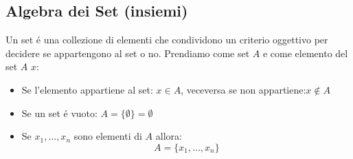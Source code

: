     \subsection{Algebra dei Set (insiemi)}
        Un set é una collezione di elementi che condividono un criterio oggettivo per decidere se appartengono al set o no. Prendiamo come set $A$ e come 
        elemento del set $A$ $x$:
        \begin{itemize}
            \item {Se l'elemento appartiene al set: $x\in A$, veceversa se non appartiene:$x\notin A$}
            \item {Se un set é vuoto: $A=\{\emptyset\}=\emptyset$}
            \item {Se $x_1, \dots, x_n$ sono elementi di $A$ allora:
                \[
                    A=\{x_1, \dots, x_n \}
                \]
            }
        \end{itemize}
